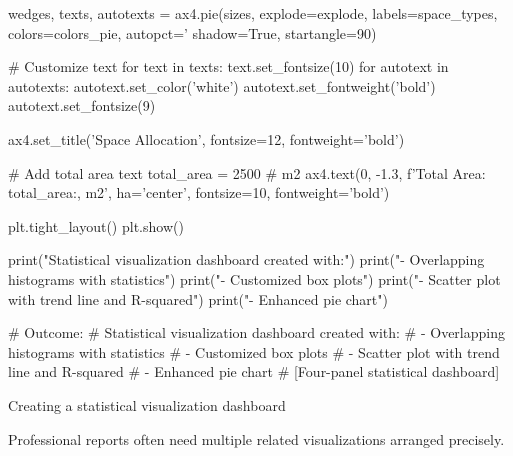 {    wedges, texts, autotexts = ax4.pie(sizes, explode=explode, labels=space_types,
                                        colors=colors_pie, autopct='%
                                        shadow=True, startangle=90)
    
    # Customize text
    for text in texts:
        text.set_fontsize(10)
    for autotext in autotexts:
        autotext.set_color('white')
        autotext.set_fontweight('bold')
        autotext.set_fontsize(9)
    
    ax4.set_title('Space Allocation', fontsize=12, fontweight='bold')
    
    # Add total area text
    total_area = 2500  # m2
    ax4.text(0, -1.3, f'Total Area: {total_area:,} m2', 
            ha='center', fontsize=10, fontweight='bold')
    
    plt.tight_layout()
    plt.show()
    
    print("Statistical visualization dashboard created with:")
    print("- Overlapping histograms with statistics")
    print("- Customized box plots")
    print("- Scatter plot with trend line and R-squared")
    print("- Enhanced pie chart")
    
    # Outcome:
    # Statistical visualization dashboard created with:
    # - Overlapping histograms with statistics
    # - Customized box plots
    # - Scatter plot with trend line and R-squared
    # - Enhanced pie chart
    # [Four-panel statistical dashboard]
}{Creating a statistical visualization dashboard}



Professional reports often need multiple related visualizations arranged precisely.

